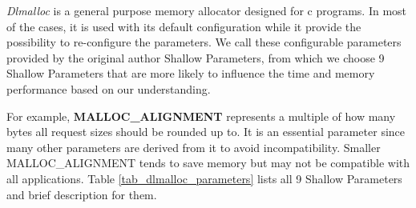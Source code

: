 
\emph{Dlmalloc} is a general purpose memory allocator designed for c programs. In most of the cases, it is used with its default configuration while it provide the possibility to re-configure the parameters. We call these configurable parameters provided by the original author Shallow Parameters, from which we choose 9 Shallow Parameters that are more likely to influence the time and memory performance based on our understanding.

For example, \textbf{MALLOC\_ALIGNMENT} represents a multiple of how many bytes all request sizes should be rounded up to. It is an essential parameter since many other parameters are derived from it to avoid incompatibility. Smaller MALLOC\_ALIGNMENT tends to save memory but may not be compatible with all applications. Table \ref{tab_dlmalloc_parameters} lists all 9 Shallow Parameters and brief description for them.


